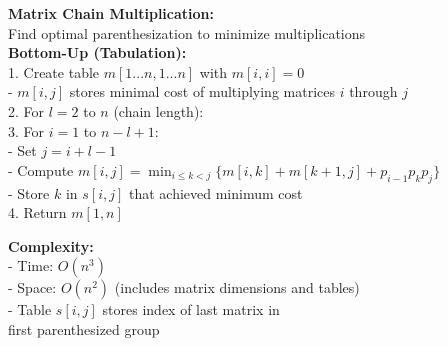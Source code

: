 \documentclass[a4paper]{extarticle}
\newcommand{\algofont}{\fontsize{4.3pt}{4.7pt}\selectfont}
\newcommand{\algocode}[1]{%
  \vspace{0pt}%
  \begin{algorithm}[H]
    \setlength{\abovecaptionskip}{0pt}%
    \setlength{\belowcaptionskip}{0pt}
    \setlength{\intextsep}{0pt}%
    \setlength{\textfloatsep}{0pt}
    \algofont  %
  \end{algorithm}%
  \vspace{0pt}%
}
\begin{document}
  \begin{minipage}[t]{0.32\textwidth}
    \textbf{Matrix Chain Multiplication:}\\
    Find optimal parenthesization to minimize multiplications\\
    \textbf{Bottom-Up (Tabulation):}\\
    1. Create table $m[1...n, 1...n]$ with $m[i,i] = 0$\\
       - $m[i,j]$ stores minimal cost of multiplying matrices $i$ through $j$\\
    2. For $l = 2$ to $n$ (chain length):\\
    3. For $i = 1$ to $n-l+1$:\\
    - Set $j = i+l-1$\\
    - Compute $m[i,j] = \min_{i\leq k<j} \{m[i,k] + m[k+1,j] + p_{i-1}p_kp_j\}$\\
    - Store $k$ in $s[i,j]$ that achieved minimum cost\\
    4. Return $m[1,n]$\\[-15px]
    \algocode{matrix-bottom-up}\vspace*{-25px}
    \textbf{Complexity:}\\
    - Time: $O(n^3)$\\
    - Space: $O(n^2)$ (includes matrix dimensions and tables)\\
    - Table $s[i,j]$ stores index of last matrix in \\first parenthesized group
    \end{minipage}
\end{document}
